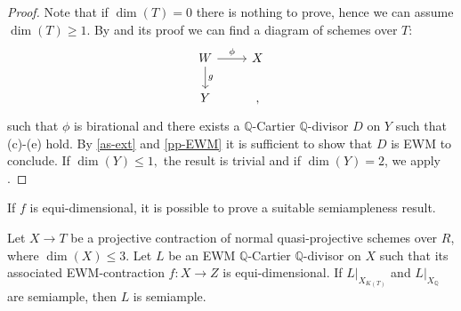\begin{proof}
	Note that if $\dim(T)=0$ there is nothing to prove, hence we can assume $\dim(T)\geq 1$. By \cite[Lemma 9.24]{bhatt2020} and its proof we can find a diagram of schemes over $T$:
	\[
	\begin{tikzcd}
	W \arrow[d, "g"] \arrow[r, "\phi"] & X  \\
	Y           &      ,
	\end{tikzcd}
	\]
	such that $\phi$ is birational and there exists a $\mathbb{Q}$-Cartier $\mathbb{Q}$-divisor $D$ on $Y$ such that (c)-(e) hold.
	By \autoref{as-ext} and \autoref{pp-EWM} it is sufficient to show that $D$ is EWM to conclude. If $\dim(Y) \leq 1,$ the result is trivial and if $\dim(Y)=2$, we apply \cite[Lemma 2.48]{bhatt2020}.
\end{proof}	

If $f$ is equi-dimensional, it is possible to prove a suitable semiampleness result.

\begin{proposition}\label{EDsemiampleness2}
	Let $X \to T$ be a projective contraction of normal quasi-projective schemes over $R$, where $\dim(X) \leq 3$.
	Let $L$ be an EWM $\mathbb{Q}$-Cartier $\mathbb{Q}$-divisor on $X$ such that its associated EWM-contraction $f \colon X \to Z$ is equi-dimensional.
	If $L|_{X_{K(T)}}$ and $L|_{X_{\mathbb{Q}}}$ are semiample, then $L$ is semiample.
\end{proposition}

